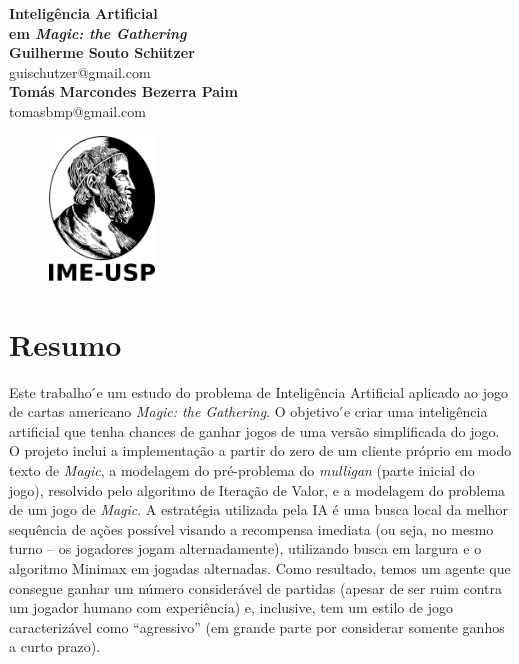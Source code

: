 \documentclass[dvipsnames]{book}
\begin{document}
  \begin{titlepage}
  \begin{center}
   {\huge\bfseries Inteligência Artificial \\ em \textit{Magic: the Gathering}\\}
   \vspace{1.5cm}
   {\bfseries Guilherme Souto Schützer}\\[5pt]
   guischutzer@gmail.com\\[14pt]
   \vspace{0.5cm}
   {\bfseries Tomás Marcondes Bezerra Paim}\\[5pt]
   tomasbmp@gmail.com\\[14pt]
   \vspace{2cm}
  {\begin{figure}[!h]
          \centering
              \includegraphics[width=0.25\textwidth]{picstcc/ime.png}
  \end{figure}}
   \vspace{0.4cm}
 \end{center}
  \end{titlepage}

\chapter*{Resumo}
Este trabalho ́e um estudo do problema de Inteligência Artificial aplicado ao jogo de cartas americano \textit{Magic: the Gathering}. O objetivo  ́e criar uma inteligência artificial que tenha chances de ganhar jogos de uma versão simplificada do jogo. O projeto inclui a implementação a partir do zero de um cliente próprio em modo texto de \textit{Magic}, a modelagem do pré-problema do \textit{mulligan} (parte inicial do jogo), resolvido pelo algoritmo de Iteração de Valor, e a modelagem do problema de um jogo de \textit{Magic}. A estratégia utilizada pela IA é uma busca local da melhor sequência de ações possível visando a recompensa imediata (ou seja, no mesmo turno – os jogadores jogam alternadamente), utilizando busca em largura e o algoritmo Minimax em jogadas alternadas. Como resultado, temos um agente que consegue ganhar um número considerável de partidas (apesar de ser ruim contra um jogador humano com experiência) e, inclusive, tem um estilo de jogo caracterizável como “agressivo” (em grande parte por considerar somente ganhos a curto prazo).
\end{document}
